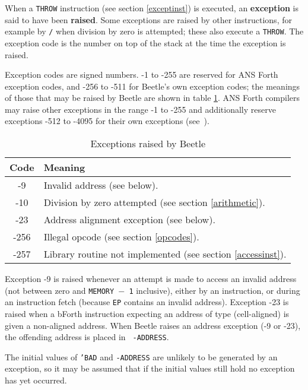 When a {\tt THROW} instruction (see section \ref{exceptinst}) is executed, an
{\bf exception} is said to have been {\bf raised}. Some exceptions are raised by
other instructions, for example by {\tt /} when division by zero is attempted;
these also execute a {\tt THROW}. The exception code is the number on top of the
stack at the time the exception is raised.

Exception codes are signed numbers. -1 to -255 are reserved for ANS Forth
exception codes, and -256 to -511 for Beetle's own exception codes; the meanings
of those that may be raised by Beetle are shown in table \ref{excepttable}. ANS
Forth compilers may raise other exceptions in the range -1 to -255 and
additionally reserve exceptions -512 to -4095 for their own exceptions
(see~\cite[section 9.3.1]{ANSIforth}).

\begin{table}[htbp]
\begin{center}
\begin{tabular}{|c|l|} \hline
\rule[-2mm]{0mm}{6mm}\bf Code & \bf Meaning \\ \hline
-9 & Invalid address (see below). \\
-10 & Division by zero attempted (see section \ref{arithmetic}). \\
-23 & Address alignment exception (see below). \\
-256 & Illegal opcode (see section \ref{opcodes}). \\
-257 & Library routine not implemented (see section \ref{accessinst}). \\ \hline
\end{tabular}
\end{center}
\vspace{-2mm}
\caption{\label{excepttable}Exceptions raised by Beetle}
\end{table}

Exception -9 is raised whenever an attempt is made to access an invalid address
(not between zero and {\tt MEMORY $-$ 1} inclusive), either by an instruction,
or during an instruction fetch (because {\tt EP} contains an invalid address).
Exception -23 is raised when a bForth instruction expecting an address of type
 (cell-aligned) is given a non-aligned address. When Beetle raises
an address exception (-9 or -23), the offending address is placed in {\tt
-ADDRESS}.

The initial values of {\tt 'BAD} and {\tt -ADDRESS} are unlikely to be generated
by an exception, so it may be assumed that if the initial values still hold no
exception has yet occurred.

